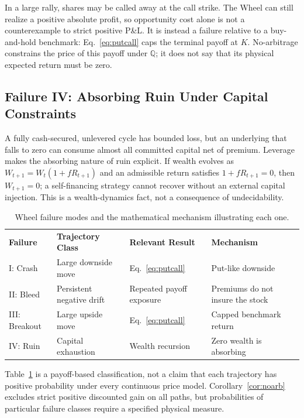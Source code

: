\documentclass[aps,pra,reprint,superscriptaddress,amsmath,amssymb,floatfix]{revtex4-2}
\theoremstyle{plain}
\theoremstyle{definition}
\theoremstyle{remark}
\begin{document}
In a large rally, shares may be called away at the call strike. The Wheel can
still realize a positive absolute profit, so opportunity cost alone is not a
counterexample to strict positive P\&L. It is instead a failure relative to a
buy-and-hold benchmark: Eq.~\eqref{eq:putcall} caps the terminal payoff at
\(K\). No-arbitrage constrains the price of this payoff under
\(\mathbb{Q}\); it does not say that its physical expected return must be zero.

\subsection{Failure IV: Absorbing Ruin Under Capital Constraints}

A fully cash-secured, unlevered cycle has bounded loss, but an underlying that
falls to zero can consume almost all committed capital net of premium.
Leverage makes the absorbing nature of ruin explicit. If wealth evolves as
\(W_{t+1}=W_t(1+fR_{t+1})\) and an admissible return satisfies
\(1+fR_{t+1}=0\), then \(W_{t+1}=0\); a self-financing strategy cannot recover
without an external capital injection. This is a wealth-dynamics fact, not a
consequence of undecidability.

\begin{table}[ht]
\caption{\label{tab:failuremodes}Wheel failure modes and the mathematical mechanism illustrating each one.}
\begin{ruledtabular}
\begin{tabular*}{\textwidth}{@{\extracolsep{\fill}}llll}
\textbf{Failure} & \textbf{Trajectory Class} & \textbf{Relevant Result} & \textbf{Mechanism} \\
\colrule
I: Crash & Large downside move & Eq.~\eqref{eq:putcall} & Put-like downside \\
II: Bleed & Persistent negative drift & Repeated payoff exposure & Premiums do not insure the stock \\
III: Breakout & Large upside move & Eq.~\eqref{eq:putcall} & Capped benchmark return \\
IV: Ruin & Capital exhaustion & Wealth recursion & Zero wealth is absorbing \\
\end{tabular*}
\end{ruledtabular}
\end{table}

Table~\ref{tab:failuremodes} is a payoff-based classification, not a claim
that each trajectory has positive probability under every continuous price
model. Corollary~\ref{cor:noarb} excludes strict positive discounted gain on
all paths, but probabilities of particular failure classes require a specified
physical measure.
\end{document}
